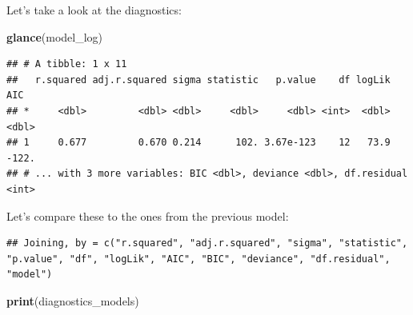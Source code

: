 \documentclass[]{gitbook}
\newenvironment{Shaded}{\begin{snugshade}}{\end{snugshade}}
\newcommand{\DataTypeTok}[1]{\textcolor[rgb]{0.13,0.29,0.53}{#1}}
\newcommand{\KeywordTok}[1]{\textcolor[rgb]{0.13,0.29,0.53}{\textbf{#1}}}
\newcommand{\NormalTok}[1]{#1}
\newcommand{\OperatorTok}[1]{\textcolor[rgb]{0.81,0.36,0.00}{\textbf{#1}}}
\newcommand{\StringTok}[1]{\textcolor[rgb]{0.31,0.60,0.02}{#1}}
\theoremstyle{definition}
\theoremstyle{definition}
\theoremstyle{definition}
\theoremstyle{remark}
\begin{document}
Let's take a look at the diagnostics:

\begin{Shaded}
\begin{Highlighting}[]
\KeywordTok{glance}\NormalTok{(model_log)}
\end{Highlighting}
\end{Shaded}

\begin{verbatim}
## # A tibble: 1 x 11
##   r.squared adj.r.squared sigma statistic   p.value    df logLik   AIC
## *     <dbl>         <dbl> <dbl>     <dbl>     <dbl> <int>  <dbl> <dbl>
## 1     0.677         0.670 0.214      102. 3.67e-123    12   73.9 -122.
## # ... with 3 more variables: BIC <dbl>, deviance <dbl>, df.residual <int>
\end{verbatim}

Let's compare these to the ones from the previous model:

\begin{Shaded}
\end{Shaded}

\begin{verbatim}
## Joining, by = c("r.squared", "adj.r.squared", "sigma", "statistic", "p.value", "df", "logLik", "AIC", "BIC", "deviance", "df.residual", "model")
\end{verbatim}

\begin{Shaded}
\begin{Highlighting}[]
\KeywordTok{print}\NormalTok{(diagnostics_models)}
\end{Highlighting}
\end{Shaded}
\end{document}
